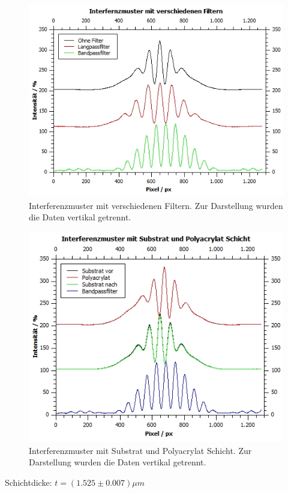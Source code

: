 \documentclass[12pt,a4paper,twoside]{article}
\begin{document}
\begin{figure}[H]
    \centering
    \includegraphics[width=0.7\linewidth]{nudes/aufgabe 2 plot.jpg}
    \caption{Interferenzmuster mit verschiedenen Filtern. Zur Darstellung wurden die Daten vertikal getrennt.}
    \label{fig:zus aufgabe 2 kontrast}
\end{figure}

\begin{figure}[H]
    \centering
    \includegraphics[width=0.7\linewidth]{nudes/aufgabe 3 plot.jpg}
    \caption{Interferenzmuster mit Substrat und Polyacrylat Schicht. Zur Darstellung wurden die Daten vertikal getrennt.}
    \label{fig:zus aufgabe 3 Interferenzmuster}
\end{figure}

\noindent
Schichtdicke: $t = (1.525 \pm 0.007)\mu m$
\end{document}

